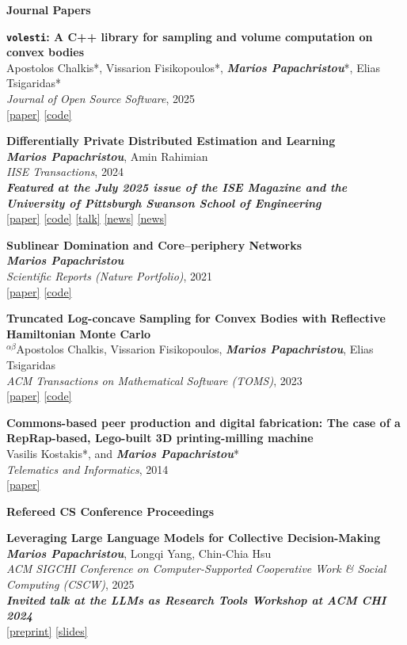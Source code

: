 \documentclass[margin]{res}
\newcommand{\field}[2]{\noindent \textbf{#1} \hfill #2 \\}
\newcommand{\alphabeticalorder}[0]{\ensuremath {^{\alpha \beta}}}
\newcommand{\specialurl}[2]{\href {#2} {{{[#1]}}}}
\newcommand{\preprint}[1]{\specialurl {preprint} {#1}}
\newcommand{\code}[1]{\specialurl {code} {#1}}
\newcommand{\talk}[1]{\specialurl {talk} {#1}}
\newcommand{\slides}[1]{\specialurl {slides} {#1}}
\newcommand{\paper}[1]{\specialurl {paper} {#1}}
\newcommand{\authorref}[1]{{\textit{\textbf{#1}}}}
\newcommand{\news}[1]{\specialurl {news} {#1}}
\newcommand{\authorme}{\authorref{Marios Papachristou}}
\newcommand{\bemph}[1]{\textbf{\emph{#1}}}
\newcommand{\publication}[5]{\textbf{#1}\\{#2}\\\emph{#3}, {#4}\\{#5}\smallskip}
\begin{document}
\begin{resume}
\field{Journal Papers}{}{
\begin{enumerate}[nosep, label={[J\arabic*]}]
	\item \publication{\texttt{volesti}: A C++ library for sampling and volume computation on convex bodies}{Apostolos Chalkis*, Vissarion Fisikopoulos*, \authorme*, Elias Tsigaridas*}{Journal of Open Source Software}{2025}{\paper{https://joss.theoj.org/papers/10.21105/joss.07886} \code{https://github.com/GeomScale/volesti}}
   \item \publication{Differentially Private Distributed Estimation and Learning}{\authorme, Amin Rahimian}{IISE Transactions}{2024}{\bemph{Featured at the July 2025 issue of the ISE Magazine and the University of Pittsburgh Swanson School of Engineering} \\
   	   	\paper{https://doi.org/10.1080/24725854.2024.2337068} \code{https://github.com/papachristoumarios/dp-distributed-estimation} \talk{https://www.youtube.com/watch?v=Kmm5HEMuS4w} \news{https://news.engineering.pitt.edu/who-sees-who/} \news{https://content.presspage.com/uploads/2602/19858d8c-d2d3-497e-9dcc-3f6eff36c157/ise-junefeature.pdf?10000}}
   \item \publication{Sublinear Domination and Core--periphery Networks}{\authorme}{Scientific Reports (Nature Portfolio)}{2021}{\paper{http://www.nature.com/articles/s41598-021-94105-8} \code{https://bit.ly/3wKNGI0}}
    \item \publication{Truncated Log-concave Sampling for Convex Bodies with Reflective Hamiltonian Monte Carlo}{\alphabeticalorder Apostolos Chalkis, Vissarion Fisikopoulos, \authorme, Elias Tsigaridas}{ACM Transactions on Mathematical Software (TOMS)}{2023}{\paper{https://doi.org/10.1145/3589505} \code{https://github.com/GeomScale/volume_approximation}}
    \item \publication{Commons-based peer production and digital fabrication: The case of a RepRap-based, Lego-built 3D printing-milling machine}{Vasilis Kostakis*, and \authorme*}{Telematics and Informatics}{2014}{\paper{https://bit.ly/2JRoisV}} 
    
\end{enumerate}}

\field{Refereed CS Conference Proceedings}{}{
\begin{enumerate}[nosep, label={[C\arabic*]}]


   \item \publication{Leveraging Large Language Models for Collective Decision-Making}{\authorme, Longqi Yang, Chin-Chia Hsu}{ACM SIGCHI Conference on Computer-Supported Cooperative Work \& Social Computing (CSCW)}{2025}{\textbf{\emph{Invited talk at the LLMs as Research Tools Workshop at ACM CHI 2024}} \\ \preprint{https://arxiv.org/abs/2311.04928} \slides{https://docs.google.com/presentation/d/13IsUt68rFoKdtq8wquL9fxVFHwH0hgvN/edit?usp=drive_link&ouid=109899272296285628946&rtpof=true&sd=true}}
 

\end{enumerate}}
\end{resume}
\end{document}
